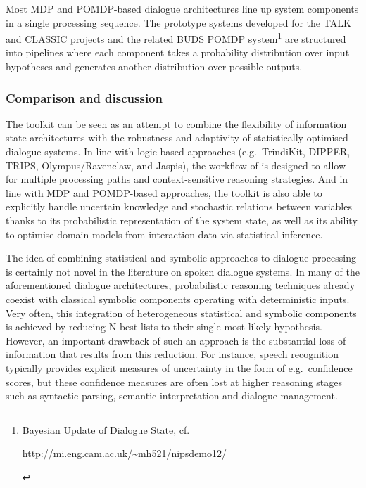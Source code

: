 Most MDP and POMDP-based dialogue architectures line up system components in a single processing sequence. The prototype systems developed for the TALK and CLASSIC projects \citep{Henderson:2008,Lemon:2012} and the related BUDS POMDP system\footnote{Bayesian Update of Dialogue State, cf. \begin{scriptsize}\url{http://mi.eng.cam.ac.uk/~mh521/nipsdemo12/}\end{scriptsize}} are structured into pipelines where each component takes a probability distribution over input hypotheses and generates another distribution over possible outputs.  



\subsubsection*{Comparison and discussion}

The \opendial{} toolkit can be seen as an attempt to combine the flexibility of information state architectures with the robustness and adaptivity of statistically optimised dialogue systems.  In line with logic-based approaches (e.g.\ TrindiKit, DIPPER, TRIPS, Olympus/Ravenclaw, and Jaspis), the workflow of \opendial{} is designed to allow for multiple processing paths and context-sensitive reasoning strategies.  And in line with MDP and POMDP-based approaches, the toolkit is also able to explicitly handle uncertain knowledge and stochastic relations between variables thanks to its probabilistic representation of the system state, as well as its ability to optimise domain models from interaction data via statistical inference.  

The idea of combining statistical and symbolic approaches to dialogue processing is certainly not novel in the literature on spoken dialogue systems.  In many of the aforementioned dialogue architectures, probabilistic reasoning techniques already coexist with classical symbolic components operating with deterministic inputs. Very often, this integration of heterogeneous statistical and symbolic components is achieved by reducing N-best lists to their single most likely hypothesis. However, an important drawback of such an approach is the substantial loss of information that results from this reduction. For instance, speech recognition typically provides explicit measures of uncertainty in the form of e.g.\ confidence scores, but these confidence measures are often lost at higher reasoning stages such as syntactic parsing, semantic interpretation and dialogue management. 

